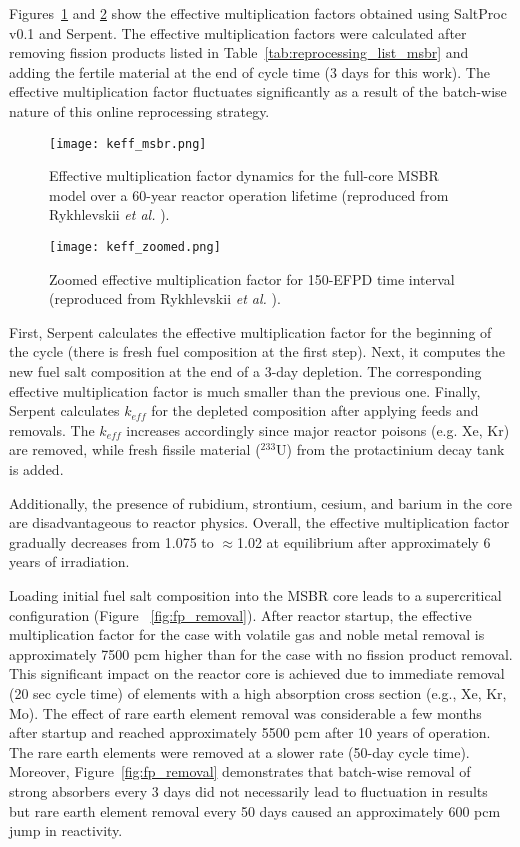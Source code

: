 Figures~\ref{fig:keff_msbr} and \ref{fig:keff_zoomed_msbr} show the effective 
multiplication factors obtained using SaltProc v0.1 and Serpent. The effective 
multiplication factors were calculated after removing fission products listed 
in Table~\ref{tab:reprocessing_list_msbr} and adding the fertile material at 
the end of cycle time (3 days for this work). The effective multiplication 
factor fluctuates significantly as a result of the batch-wise nature of this 
online reprocessing strategy. 
\begin{figure}[ht!] 
	\centering
	\texttt{[image: keff\_msbr.png]}
	\caption{Effective multiplication factor dynamics for the full-core 
	\gls{MSBR} 
		model over a 60-year reactor operation lifetime (reproduced from  
		Rykhlevskii \emph{et al.} \cite{rykhlevskii_modeling_2019}).}
	\label{fig:keff_msbr}
\end{figure}
\begin{figure}[ht!] 
	\centering
	\texttt{[image: keff\_zoomed.png]}
	\caption{Zoomed effective multiplication factor for 150-EFPD time interval 
		(reproduced from Rykhlevskii \emph{et al.} 
		\cite{rykhlevskii_modeling_2019}).}
	\label{fig:keff_zoomed_msbr}
\end{figure}

First, Serpent calculates the effective multiplication factor for the 
beginning of the cycle (there is fresh fuel composition at the first step). 
Next, it computes the new fuel salt composition at the end of a 3-day 
depletion. The corresponding effective multiplication factor is much smaller 
than the previous one. Finally, Serpent calculates $k_{eff}$ for the depleted 
composition after applying feeds and removals. The $k_{eff}$ increases 
accordingly since major reactor poisons (e.g. Xe, Kr) are removed, while fresh 
fissile material ($^{233}$U) from the protactinium decay tank is added.  

Additionally, the presence of rubidium, strontium, cesium, and barium in the 
core are disadvantageous to reactor physics. 
Overall, the effective multiplication factor gradually decreases from 1.075 to 
$\approx$1.02 at equilibrium after approximately 6 years of irradiation. 

Loading initial fuel salt composition into the \gls{MSBR} core leads to a 
supercritical configuration (Figure ~\ref{fig:fp_removal}). After reactor 
startup, the effective multiplication factor for the case with volatile gas 
and noble metal removal is approximately 7500 pcm  higher than for the case 
with no fission product removal. This significant impact on the reactor core is
achieved due to immediate removal (20 sec cycle time) of elements with a high 
absorption cross section (e.g., Xe, Kr, Mo). The effect of rare earth 
element removal was considerable a few months after startup and reached 
approximately 5500 pcm after 10 years of operation. The rare earth elements 
were removed at a slower rate (50-day cycle time). Moreover, 
Figure~\ref{fig:fp_removal} demonstrates that batch-wise removal of strong 
absorbers every 3 days did not necessarily lead to fluctuation in results 
but rare earth element removal every 50 days caused an approximately 600 pcm 
jump in reactivity.

